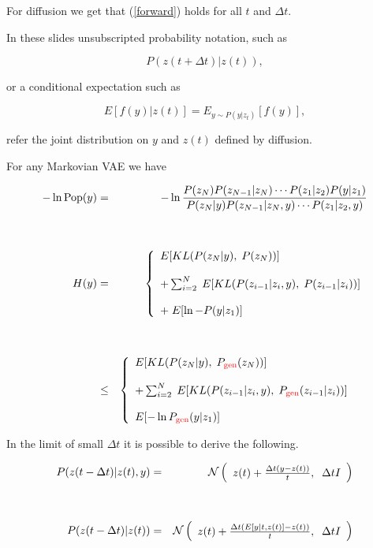 {\vfill
For diffusion we get that (\ref{forward}) holds for all $t$ and $\Delta t$.


In these slides unsubscripted probability notation, such as

\vfill
$$P(z(t+\Delta t)|z(t)),$$

\vfill
or a conditional expectation such as

\vfill
$$E[f(y)|z(t)] = E_{y \sim P(y|z_t)}[f(y)],$$

\vfill
refer the joint distribution on $y$ and $z(t)$ defined by diffusion.


For any Markovian VAE we have

\vfill
{\Large
\begin{eqnarray}
  - \ln \mathrm{Pop}(y) & = & - \ln\frac{P(z_N)P(z_{N-1}|z_N)\cdots P(z_1|z_2)P(y|z_1)}{P(z_N|y)P(z_{N-1}|z_N,y)\cdots P(z_1|z_2,y)} \nonumber\\
  \nonumber \\
  \nonumber \\
  H(y) & = & \left\{\begin{array}{l} E[KL(P(z_N|y),\;P(z_N))] \\ \\ + \sum_{i=2}^N  \; E[KL(P(z_{i-1}|z_i,y),\;P(z_{i-1}|z_i))] \\ \\ +\;E[\ln -P(y|z_1)] \end{array}\right. \label{Markov-eq} \\
  \nonumber\\
  \nonumber\\
  & \leq & \left\{\begin{array}{l} E[KL(P(z_N|y),\;P_{\color{red} \mathrm{gen}}(z_N))] \\ \\ + \sum_{i=2}^N  \; E[KL(P(z_{i-1}|z_i,y),\;P_{\color{red} \mathrm{gen}}(z_{i-1}|z_i))] \\ \\ E[- \ln P_{\color{red} \mathrm{gen}}(y|z_1)] \end{array}\right. \;\;\;~\label{Markov-ELBO}
\end{eqnarray}
}


In the limit of small $\Delta t$ it is possible to derive the following.

\begin{eqnarray*}
  P(z(t - \Delta t)|z(t),y) & = & {\cal N}\left(\begin{array}{l}z(t) + \frac{\Delta t(y - z(t))}{t},\;\; \Delta t I\end{array}\right) \\
  \\
  \\
  P(z(t - \Delta t)|z(t)) & = & {\cal N}\left(\begin{array}{l} z(t) + \frac{\Delta t(E[y|t,z(t)] - z(t))}{t}, \;\; \Delta t I\end{array}\right)
\end{eqnarray*}


}
